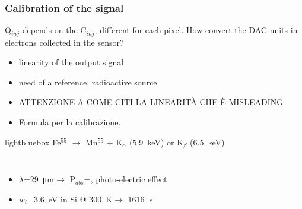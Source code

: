     \begin{frame}
        \frametitle{Calibration of the signal}
        Q$_{inj}$ depends on the C$_{inj}$, different for each pixel.     
        \bigskip
        How convert the DAC units in electrons collected in the sensor?\\
        \begin{itemize}
            \item linearity of the output signal 
            \item need of a reference, radioactive source
            \item ATTENZIONE A COME CITI LA LINEARITÀ CHE È MISLEADING
            \item Formula per la calibrazione. 
        \end{itemize}
        \bigskip
        \begin{beamercolorbox}[sep=0em,wd=0.85\textwidth,ht=1.5ex, dp=0.1ex, rounded=true, center]{lightbluebox}
            Fe$^{55}$ $\rightarrow$ Mn$^{55}$ + K$_\alpha$ (\SI{5.9}{keV}) or K$_\beta$ (\SI{6.5}{keV})
        \end{beamercolorbox}
        \begin{columns}
            \begin{itemize}
                \item $\lambda$=\SI{29}{\um}$\rightarrow$ P$_{abs}$=, photo-electric effect
                \item $w_i$=\SI{3.6}{eV} in Si @ \SI{300}{\kelvin}$\rightarrow$ \SI{1616}{\elementarycharge}$^-$
            \end{itemize}
        \end{columns}
    \end{frame}  


